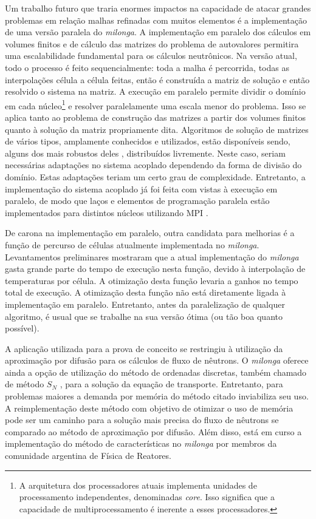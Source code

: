 Um trabalho futuro que traria enormes impactos na capacidade de atacar grandes problemas em relação malhas refinadas
com muitos elementos é a implementação de uma versão paralela do \textit{milonga}. A implementação em paralelo dos
cálculos em volumes finitos e de cálculo das matrizes do problema de autovalores permitira uma escalabilidade
fundamental para os cálculos neutrônicos. Na versão atual, todo o processo é feito sequencialmente: toda a malha
é percorrida, todas as interpolações célula a célula feitas, então é construída a matriz de solução e então resolvido
o sistema na matriz. A execução em paralelo permite dividir o domínio em cada núcleo\footnote{A arquitetura dos processadores
  atuais implementa unidades de processamento independentes, denominadas \textit{core}. Isso significa que a
capacidade de multiprocessamento é inerente a esses processadores.} e resolver paralelamente
uma escala menor do problema. Isso se aplica tanto ao problema de construção das matrizes a partir dos volumes finitos
quanto à solução da matriz propriamente dita. Algoritmos de solução de matrizes de vários tipos, amplamente conhecidos
e utilizados, estão disponíveis sendo, alguns dos mais robustos deles \cite{Hernandez2005, Balay2016}, distribuídos livremente.
Neste caso, seriam necessárias adaptações no sistema acoplado dependendo da forma de divisão do domínio. Estas adaptações teriam
um certo grau de complexidade. Entretanto, a implementação do sistema acoplado já foi feita com vistas à execução em paralelo,
de modo que laços e elementos de programação paralela estão implementados para distintos núcleos utilizando MPI \cite{Quinn2004}.

De carona na implementação em paralelo, outra candidata para melhorias é a função de percurso de células atualmente
implementada no \textit{milonga}. Levantamentos preliminares mostraram que a atual implementação do \textit{milonga}
gasta grande parte do tempo de execução nesta função, devido à interpolação de temperaturas por célula. A otimização
desta função levaria a ganhos no tempo total de execução. A otimização desta função não está diretamente ligada à
implementação em paralelo. Entretanto, antes da paralelização de qualquer algoritmo, é usual que
se trabalhe na sua versão ótima (ou tão boa quanto possível).

A aplicação utilizada para a prova de conceito se restringiu à utilização da aproximação por difusão para os cálculos
de fluxo de nêutrons. O \textit{milonga} oferece ainda a opção de utilização do método de ordenadas discretas,
também chamado de método $S_N$ \cite{Hebert2009}, para a solução da equação de transporte. Entretanto, para problemas
maiores a demanda por memória do método citado inviabiliza seu uso. A reimplementação deste método com objetivo de
otimizar o uso de memória pode ser um caminho para a solução mais precisa do fluxo de nêutrons se comparado ao método
de aproximação por difusão. Além disso, está em curso a implementação do método de características \cite{Hebert2009} no \textit{milonga}
por membros da comunidade argentina de Física de Reatores.

